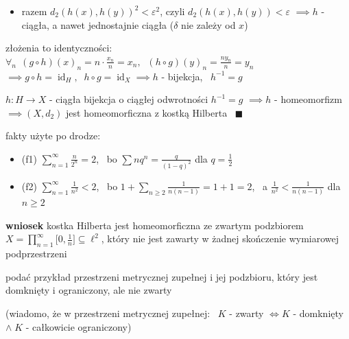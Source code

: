 \documentclass[a4paper,12pt]{article}
\begin{document}
\begin{steps}
\begin{podpunkty}
\begin{itemize}
\begin{align*}
            \sum_{n=1}^{N} \frac{(x_n - y_n)^2}{n^2} \leq 4^N d(x, y)^2 \sum_{n=1}^{N} \frac{1}{n^2} \overset{(\text{f2})}{<} 2 \cdot 4^N \delta^2 = 2 \cdot 4^N \cdot \frac{\varepsilon^2}{4^{N+1}} = \frac{\varepsilon^2}{2}
            \end{align*}
            \item razem \(d_2(h(x), h(y))^2 < \varepsilon^2\), czyli \(d_2(h(x), h(y)) < \varepsilon\) \(\implies h\) - ciągła, a nawet jednostajnie ciągła (\(\delta\) nie zależy od \(x\))
        \end{itemize}
    \end{podpunkty}
    \item złożenia to identyczności: \, \(\forall_n \;\, (g \circ h)(x)_n = n \cdot \frac{x_n}{n} = x_n, \;\; (h \circ g)(y)_n = \frac{n y_n}{n} = y_n\) \\
    \(\implies g \circ h = \operatorname{id}_H, \;\; h \circ g = \operatorname{id}_X \implies h\) - bijekcja, \, \(h^{-1} = g\)
    \item \(h: H \to X\) - ciągła bijekcja o ciągłej odwrotności \(h^{-1} = g\) \(\implies h\) - homeomorfizm \(\implies (X, d_2)\) jest homeomorficzna z kostką Hilberta \, \(\blacksquare\)
\end{steps}

\smallskip
fakty użyte po drodze:
\begin{itemize}
    \item (f1) \; \(\sum_{n=1}^{\infty} \frac{n}{2^n} = 2\), \, bo \(\sum n q^n = \frac{q}{(1 - q)^2}\) dla \(q = \frac{1}{2}\)
    \item (f2) \; \(\sum_{n=1}^{\infty} \frac{1}{n^2} < 2\), \, bo \(1 + \sum_{n \geq 2} \frac{1}{n(n-1)} = 1 + 1 = 2\), \, a \(\frac{1}{n^2} < \frac{1}{n(n-1)}\) dla \(n \geq 2\)
\end{itemize}

\bigskip
\textbf{wniosek} \; kostka Hilberta jest homeomorficzna ze zwartym podzbiorem \(X = \prod_{n=1}^{\infty} \big[0, \frac{1}{n}\big] \subseteq \ell^2\), który nie jest zawarty w żadnej skończenie wymiarowej podprzestrzeni

\bigskip
{} \; podać przykład przestrzeni metrycznej zupełnej i jej podzbioru, który jest domknięty i ograniczony, ale nie zwarty

\smallskip
(wiadomo, że w przestrzeni metrycznej zupełnej: \, \(K\) - zwarty \(\iff K\) - domknięty \(\land \; K\) - całkowicie ograniczony)
\end{document}
